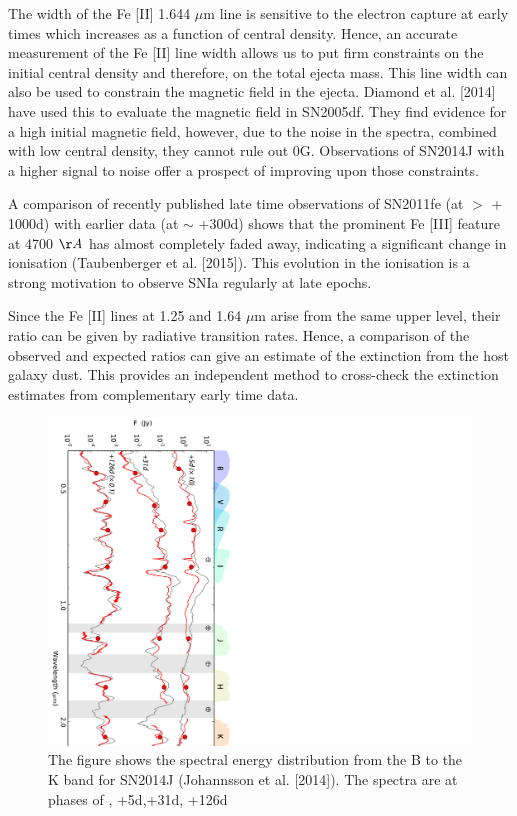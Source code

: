 \documentclass[11pt]{article}
\begin{document}
The width of the Fe [II] 1.644 $\mu$m line is sensitive to the electron capture at early times which increases as a function of central density. Hence, an accurate measurement of the Fe [II] line width allows us to put firm constraints on the initial central density and therefore, on the total ejecta mass. This line width can also be used to constrain the magnetic field in the ejecta. Diamond et al. [2014] have used this to evaluate the magnetic field in SN2005df. They find evidence for a high initial magnetic field, however, due to the noise in the spectra, combined with low central density,  they cannot rule out 0G. Observations of SN2014J with a higher signal to noise offer a prospect of improving upon those constraints.  

A comparison of recently published late time observations of SN2011fe (at $>$ + 1000d) with earlier data (at $\sim$ +300d) shows that the prominent Fe [III] feature at 4700 $\AA$ has almost completely faded away, indicating a significant change in ionisation (Taubenberger et al. [2015]). This evolution in the ionisation is a strong motivation to observe SNIa regularly at late epochs.  

Since the Fe [II] lines at 1.25 and 1.64 $\mu$m arise from the same upper level, their ratio can be given by radiative transition rates. Hence, a comparison of the observed and expected ratios can give an estimate of the extinction from the host galaxy dust. This provides an independent method to cross-check the extinction estimates from complementary early time data. 

\begin{figure}
\includegraphics[width=.8\textwidth, angle = 90]{../uvoir_sed.pdf}
\caption{The figure shows the spectral energy distribution from the B to the K band for SN2014J (Johannsson et al. [2014]). The spectra are at phases of , +5d,+31d, +126d}
\end{figure}
\end{document}
